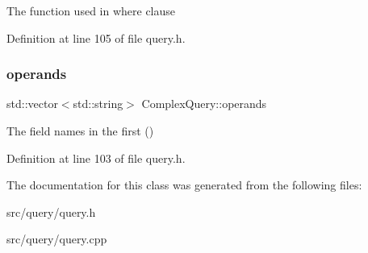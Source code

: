 The function used in where clause 

Definition at line 105 of file query.\+h.

\mbox{\label{class_complex_query_a00f38ae7b87fefa8668d7bac95addd94}} 
\subsubsection{\texorpdfstring{operands}{operands}}
{\footnotesize\ttfamily std\+::vector$<$std\+::string$>$ Complex\+Query\+::operands\hspace{0.3cm}{\ttfamily [protected]}}

The field names in the first () 

Definition at line 103 of file query.\+h.



The documentation for this class was generated from the following files\+:\begin{DoxyCompactItemize}
\item 
src/query/query.\+h\item 
src/query/query.\+cpp\end{DoxyCompactItemize}
